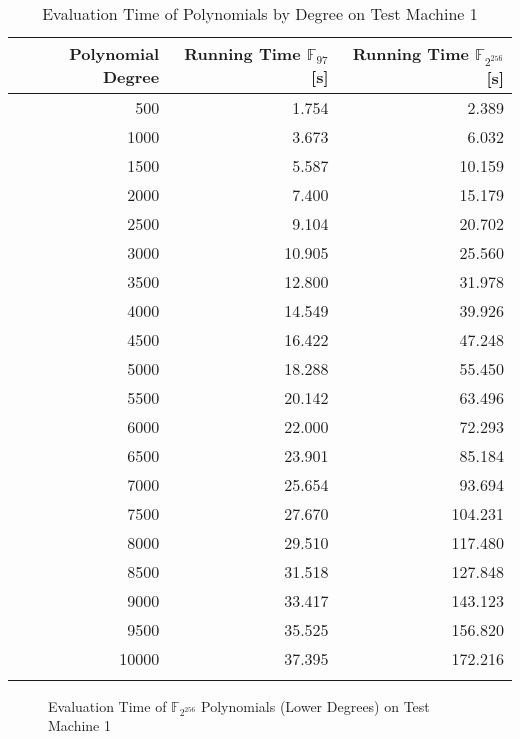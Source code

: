 \begin{table}[ht]
  \centering
  \begin{tabular}{rrr}
    \toprule
    Polynomial Degree & Running Time $\mathbb{F}_{97}$ [s] & Running Time
    $\mathbb{F}_{2^{256}}$ [s]\\
    \midrule
    500 &  1.754 &   2.389 \\
    1000 &  3.673 &   6.032 \\
    1500 &  5.587 &  10.159 \\
    2000 &  7.400 &  15.179 \\
    2500 &  9.104 &  20.702 \\
    3000 & 10.905 &  25.560 \\
    3500 & 12.800 &  31.978 \\
    4000 & 14.549 &  39.926 \\
    4500 & 16.422 &  47.248 \\
    5000 & 18.288 &  55.450 \\
    5500 & 20.142 &  63.496 \\
    6000 & 22.000 &  72.293 \\
    6500 & 23.901 &  85.184 \\
    7000 & 25.654 &  93.694 \\
    7500 & 27.670 & 104.231 \\
    8000 & 29.510 & 117.480 \\
    8500 & 31.518 & 127.848 \\
    9000 & 33.417 & 143.123 \\
    9500 & 35.525 & 156.820 \\
    10000 & 37.395 & 172.216 \\
    \bottomrule
    \label{tab:poly-deg-t}
  \end{tabular}
  \caption{Evaluation Time of Polynomials by Degree on Test Machine 1}
\end{table}

\begin{figure}[ht]
  \centering
  
  \caption{Evaluation Time of $\mathbb{F}_{2^{256}}$ Polynomials
  (Lower Degrees) on Test Machine 1}
  \label{fig:poly-deg-t-small}
\end{figure}

